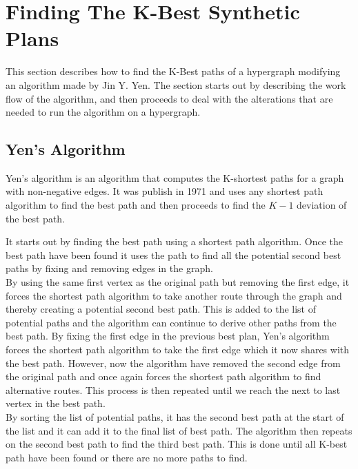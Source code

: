 \documentclass[a4paper,10pt,titlepage]{paper}
\begin{document}
\section{Finding The K-Best Synthetic Plans}
\label{sec::K-Best}
This section describes how to find the K-Best paths of a hypergraph modifying an algorithm made by Jin Y. Yen. The section starts out by describing the work flow of the algorithm, and then proceeds to deal with the alterations that are needed to run the algorithm on a hypergraph.
\subsection{Yen's Algorithm}
Yen's algorithm is an algorithm that computes the K-shortest paths for a graph with non-negative edges. It was publish in 1971 and uses any shortest path algorithm to find the best path and then proceeds to find the $K-1$ deviation of the best path. \cite{Yen}

It starts out by finding the best path using a shortest path algorithm. Once the best path have been found it uses the path to find all the potential second best paths by fixing and removing edges in the graph. \\
By using the same first vertex as the original path but removing the first edge, it forces the shortest path algorithm to take another route through the graph and thereby creating a potential second best path. This is added to the list of potential paths and the algorithm can continue to derive other paths from the best path. By fixing the first edge in the previous best plan, Yen's algorithm forces the shortest path algorithm to take the first edge which it now shares with the best path. However, now the algorithm have removed the second edge from the original path and once again forces the shortest path algorithm to find alternative routes. This process is then repeated until we reach the next to last vertex in the best path.\\
By sorting the list of potential paths, it has the second best path at the start of the list and it can add it to the final list of best path. The algorithm then repeats on the second best path to find the third best path. This is done until all K-best path have been found or there are no more paths to find.
\end{document}

